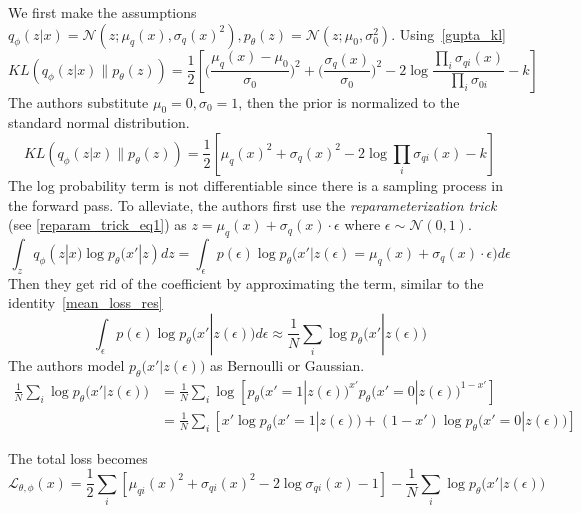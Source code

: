 \documentclass{book}
\numberwithin{equation}{subsection}
\begin{document}
We first make the assumptions $q_\phi(z|x)=\mathcal{N}(z;\mu_q(x),\sigma_q(x)^2), p_\theta(z)=\mathcal{N}(z;\mu_0,\sigma_0^2)$. Using~\ref{gupta_kl}
\begin{equation}
    KL(q_\phi(z|x) \parallel p_\theta(z)) = \frac{1}{2}\left[\Big(\frac{\mu_q(x)-\mu_0}{\sigma_0}\Big)^2+\Big(\frac{\sigma_q(x)}{\sigma_0}\Big)^2-2\log\frac{\prod_i\sigma_{qi}(x)}{\prod_i\sigma_{0i}} - k\right]
\end{equation}
The authors substitute $\mu_0=0,\sigma_0=1$, then the prior is normalized to the standard normal distribution.
\begin{equation}
    KL(q_\phi(z|x) \parallel p_\theta(z)) = \frac{1}{2}\left[\mu_q(x)^2+\sigma_q(x)^2-2\log\prod_i\sigma_{qi}(x) - k\right]
\end{equation}
The log probability term is not differentiable since there is a sampling process in the forward pass. To alleviate, the authors first use the \textit{reparameterization trick} (see \ref{reparam_trick_eq1}) as $z = \mu_q(x)+\sigma_q(x) \cdot \epsilon$ where $\epsilon \sim \mathcal{N}(0,1)$.
\begin{equation}
    \int_z q_\phi(z|x)\log p_\theta(x'|z)dz = \int_\epsilon p(\epsilon)\log p_\theta \big(x'|z(\epsilon) = \mu_q(x)+\sigma_q(x) \cdot \epsilon \big)d\epsilon
\end{equation}
Then they get rid of the coefficient by approximating the term, similar to the identity~\ref{mean_loss_res}
\begin{equation}
    \int_\epsilon p(\epsilon)\log p_\theta \big(x'|z(\epsilon) \big)d\epsilon \approx \frac{1}{N}\sum_i \log p_\theta \big(x'|z(\epsilon) \big)
\end{equation}
The authors model $p_\theta \big(x'|z(\epsilon) \big)$ as Bernoulli or Gaussian. 
\begin{align}
    \frac{1}{N}\sum_i \log p_\theta \big(x'|z(\epsilon) \big) &= \frac{1}{N}\sum_i \log\left[p_\theta \big(x'= 1|z(\epsilon) \big)^{x'}p_\theta \big(x'= 0|z(\epsilon) \big)^{1-x'}\right]\\
    &= \frac{1}{N}\sum_i \left[x'\log p_\theta \big(x'= 1|z(\epsilon) \big) + (1-x')\log p_\theta \big(x'= 0|z(\epsilon) \big)\right]
\end{align}

The total loss becomes
\begin{equation}
    \mathcal{L}_{\theta, \phi}(x) = \frac{1}{2}\sum_i\left[\mu_{qi}(x)^2+\sigma_{qi}(x)^2-2\log\sigma_{qi}(x) - 1\right] - \frac{1}{N}\sum_i \log p_\theta \big(x'|z(\epsilon) \big)
\end{equation}
\end{document}
